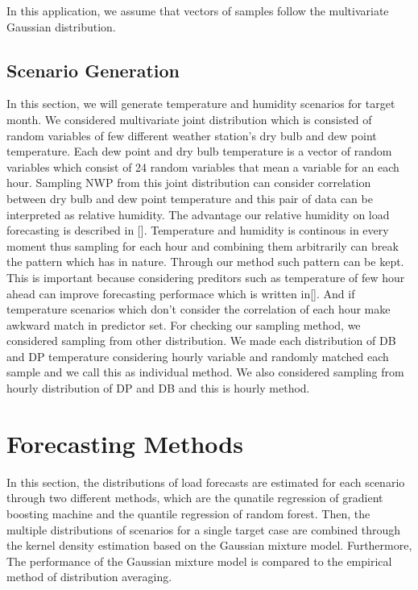 \documentclass[journal]{IEEEtran} %
\begin{document}
 In this application, we assume that vectors of samples follow the multivariate Gaussian distribution.




\subsection{Scenario Generation}

In this section, we will generate temperature and humidity scenarios for target month. We considered multivariate joint distribution which is consisted of random variables of few different weather station's dry bulb and dew point temperature. Each dew point and dry bulb temperature is a vector of random variables which consist of 24 random variables that mean a variable for an each hour. Sampling NWP from this joint distribution can consider correlation between dry bulb and dew point temperature and this pair of data can be interpreted as relative humidity. The advantage our relative humidity on load forecasting is described in []. Temperature and humidity is continous in every moment thus sampling for each hour and combining them arbitrarily can break the pattern which has in nature. Through our method such pattern can be kept. This is important because considering preditors such as temperature of few hour ahead can improve forecasting performace which is written in[]. And if temperature scenarios which don't consider the correlation of each hour make awkward match in predictor set. For checking our sampling method, we considered sampling from other distribution. We made each distribution of DB and DP temperature considering hourly variable and randomly matched each sample and we call this as individual method. We also considered sampling from hourly distribution of DP and DB and this is hourly method. 



\section{Forecasting Methods}
In this section, the distributions of load forecasts are estimated for each scenario through two different methods, which are the qunatile regression of gradient boosting machine and the quantile regression of random forest. Then, the multiple distributions of scenarios for a single target case are combined through the kernel density estimation based on the Gaussian mixture model. Furthermore, The performance of the Gaussian mixture model is compared to the empirical method of distribution averaging. 
\end{document}
